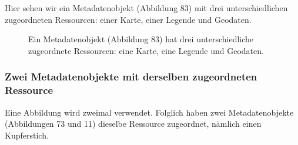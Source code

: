 \documentclass[
  letterpaper,
  DIV=11,
  numbers=noendperiod,
  landscape,
  a4paper,
  geometry:margin=1in]{scrartcl}
\begin{document}
Hier sehen wir ein Metadatenobjekt (Abbildung 83) mit drei
unterschiedlichen zugeordneten Ressourcen: einer Karte, einer Legende
und Geodaten.

\begin{figure}


\caption{\label{fig-metadata-3}Ein Metadatenobjekt (Abbildung 83) hat
drei unterschiedliche zugeordnete Ressourcen: eine Karte, eine Legende
und Geodaten.}

\end{figure}%

\subsubsection{Zwei Metadatenobjekte mit derselben zugeordneten
Ressource}\label{zwei-metadatenobjekte-mit-derselben-zugeordneten-ressource}

Eine Abbildung wird zweimal verwendet. Folglich haben zwei
Metadatenobjekte (Abbildungen 73 und 11) dieselbe Ressource zugeordnet,
nämlich einen Kupferstich.
\end{document}
